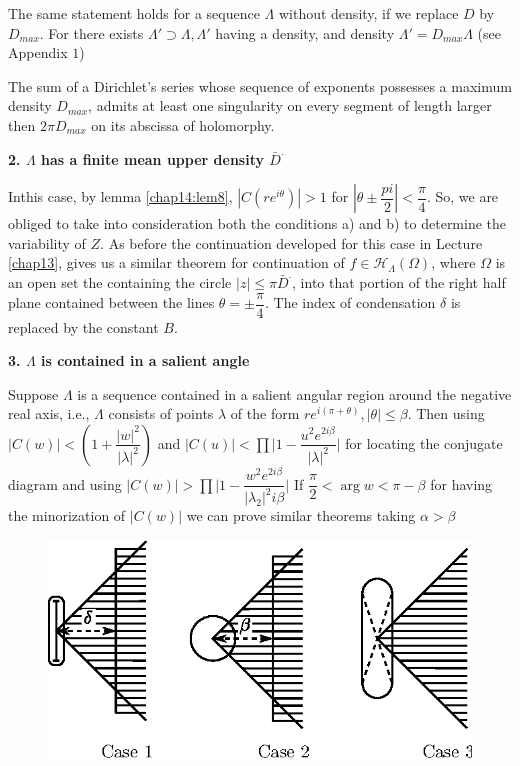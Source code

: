 The same statement holds for a sequence $\Lambda$ without density, if
we replace $D$ by $D_{max}$. For there exists $\Lambda' \supset
\Lambda, \Lambda'$ having a density, and density $\Lambda' = D_{max}
\Lambda$ (see Appendix $1$) 
\begin{coro*}
 The sum of a Dirichlet's series whose sequence of exponents
 possesses a maximum density $D_{max}$, admits at least one
 singularity on every segment of length larger then $2 \pi D_{max}$
 on its abscissa of holomorphy. 
\end{coro*}

\noindent \textbf{2. $\Lambda$ has a finite mean upper density
  $\bar{D}^.$}

In\pageoriginale this case, by lemma \ref{chap14:lem8}, $|C (r e^{i \theta})| > 1$ for $|\theta
\pm \dfrac{pi}{2}| <\dfrac{\pi}{4}$. So, we are obliged to take into
consideration both the conditions a) and b) to determine the
variability of $Z$. As before the continuation developed for this case
in Lecture \ref{chap13}, gives us a similar theorem for continuation of $f
\in \mathscr{H}_\Lambda (\Omega)$, where $\Omega$ is an open
set the containing the circle $|z| \le \pi \bar{D}^.$, into that
portion of the right half plane contained between the lines $\theta =
\pm \dfrac{\pi}{4}$. The index of condensation $\delta$ is replaced by
the constant $B$. 

\noindent \textbf{3. $\Lambda$ is contained in a salient angle} 

Suppose $\Lambda$ is a sequence contained in a salient angular region
around the negative real axis, i.e., $\Lambda$ consists of points
$\lambda$ of the form $r e^{i (\pi +\theta)}, |\theta| \le
\beta$. Then using $|C (w)|< (1 + \dfrac{|w|^2} {|\lambda|^2})$ and
$|C (u)| < \prod|1 - \dfrac{u^2 e^{2 i \beta}}{|\lambda|^2}\big|$ for
locating the conjugate diagram and using $|C (w)| > \prod|1 -
\dfrac{w^2 e^{2 i \beta}}{|\lambda_2|^2 i \beta}\big|$ If $\dfrac
  {\pi}{2} < \arg w < \pi - \beta$ for having the minorization of
  $|C (w)|$ we can prove similar theorems taking $\alpha> \beta$
 \begin{figure}[H]
 \centerline{\includegraphics{vol15-figures/fig15-14.eps}}
 \end{figure}

